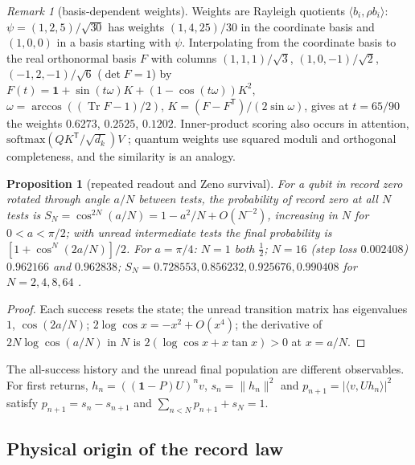 \documentclass[aps,pra,onecolumn,superscriptaddress,nofootinbib,10pt]{revtex4-2}
\newtheorem{proposition}[theorem]{Proposition}
\theoremstyle{definition}
\theoremstyle{remark}
\newtheorem{remark}[theorem]{Remark}
\newcommand{\tr}{\operatorname{Tr}}
\newcommand{\ip}[2]{\langle #1,#2\rangle}
\begin{document}
\begin{remark}[basis-dependent weights]\label{rem:sobasis}
Weights are Rayleigh quotients $\ip{b_i}{\rho b_i}$: $\psi=(1,2,5)/\sqrt{30}$ has weights $(1,4,25)/30$ in the coordinate basis and $(1,0,0)$ in a
basis starting with $\psi$.  Interpolating from the coordinate basis to the real orthonormal basis $F$ with
columns $(1,1,1)/\sqrt3$, $(1,0,-1)/\sqrt2$, $(-1,2,-1)/\sqrt6$ ($\det F=1$) by $F(t)=\mathbf1+\sin(t\omega)K+(1-\cos(t\omega))K^2$, $\omega=\arccos((\tr F-1)/2)$,
$K=(F-F^{\mathsf T})/(2\sin\omega)$, gives at $t=65/90$ the weights $0.6273$, $0.2525$, $0.1202$.  Inner-product scoring also occurs in
attention, $\mathrm{softmax}(QK^{\mathsf T}/\sqrt{d_k})V$ \cite[Sec.~3.2.1]{n3:Attention}; quantum weights use squared moduli and
orthogonal completeness, and the similarity is an analogy.
\end{remark}

\begin{proposition}[repeated readout and Zeno survival]\label{prop:sozeno}
For a qubit in record zero rotated through angle $a/N$ between tests, the probability of record zero at all $N$
tests is $S_N=\cos^{2N}(a/N)=1-a^2/N+O(N^{-2})$, increasing in $N$ for $0<a<\pi/2$; with unread intermediate tests the final
probability is $[1+\cos^N(2a/N)]/2$.  For $a=\pi/4$: $N=1$ both $\tfrac12$; $N=16$ (step loss $0.002408$) $0.962166$ and $0.962838$;
$S_N=0.728553,0.856232,0.925676,0.990408$ for $N=2,4,8,64$ \cite{n3:Zeno}.
\end{proposition}
\begin{proof}
Each success resets the state; the unread transition matrix has eigenvalues $1$, $\cos(2a/N)$; $2\log\cos x=-x^2+O(x^4)$; the
derivative of $2N\log\cos(a/N)$ in $N$ is $2(\log\cos x+x\tan x)>0$ at $x=a/N$.
\end{proof}
\noindent The all-success history and the unread final population are different observables.  For first
returns, $h_n=((\mathbf1-P)U)^nv$, $s_n=\lVert h_n\rVert^2$ and $p_{n+1}=\lvert\ip v{Uh_n}\rvert^2$ satisfy $p_{n+1}=s_n-s_{n+1}$ and $\sum_{n<N}p_{n+1}+s_N=1$.

\subsection{Physical origin of the record law}\label{sec:soscope}
\end{document}
